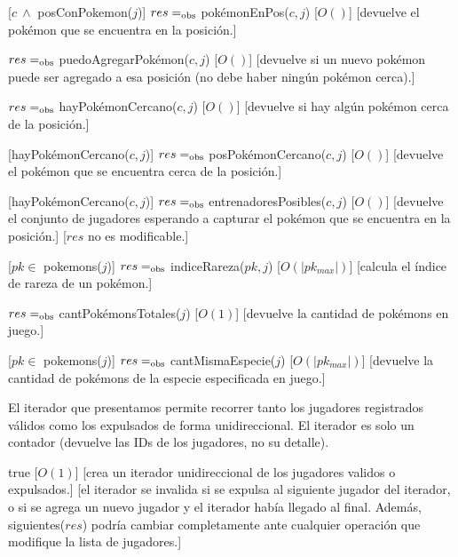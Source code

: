 \begin{Interfaz}
	[$c \ \land$ posConPokemon($j$)]
	{$res =_{\mathrm{obs}}$ pokémonEnPos($c,j$)}
	[$O()$]
	[devuelve el pokémon que se encuentra en la posición.]

	{$res =_{\mathrm{obs}}$ puedoAgregarPokémon($c,j$)}
	[$O()$]
	[devuelve si un nuevo pokémon puede ser agregado a esa posición (no debe haber ningún pokémon cerca).]

	{$res =_{\mathrm{obs}}$ hayPokémonCercano($c,j$)}
	[$O()$]
	[devuelve si hay algún pokémon cerca de la posición.]

	[hayPokémonCercano($c,j$)]
	{$res =_{\mathrm{obs}}$ posPokémonCercano($c,j$)}
	[$O()$]
	[devuelve el pokémon que se encuentra cerca de la posición.]

	[hayPokémonCercano($c,j$)]
	{$res =_{\mathrm{obs}}$ entrenadoresPosibles($c,j$)}
	[$O()$]
	[devuelve el conjunto de jugadores esperando a capturar el pokémon que se encuentra en la posición.]
	[$res$ no es modificable.]

	[$pk \in$ pokemons($j$)]
	{$res =_{\mathrm{obs}}$ indiceRareza($pk,j$)}
	[$O(|pk_{max}|)$]
	[calcula el índice de rareza de un pokémon.]

	{$res =_{\mathrm{obs}}$ cantPokémonsTotales($j$)}
	[$O(1)$]
	[devuelve la cantidad de pokémons en juego.]

	[$pk \in$ pokemons($j$)]
	{$res =_{\mathrm{obs}}$ cantMismaEspecie($j$)}
	[$O(|pk_{max}|)$]
	[devuelve la cantidad de pokémons de la especie especificada en juego.]


	El iterador que presentamos permite recorrer tanto los jugadores registrados válidos como los expulsados de forma unidireccional. El iterador es solo un contador (devuelve las IDs de los jugadores, no su detalle).


	{true}
	[$O(1)$]
	[crea un iterador unidireccional de los jugadores validos o expulsados.]
	[el iterador se invalida si se expulsa al siguiente jugador del iterador, o si se agrega un nuevo jugador y el iterador había llegado al final. Además, siguientes($res$) podría cambiar completamente ante cualquier operación que modifique la lista de jugadores.]


\end{Interfaz}

